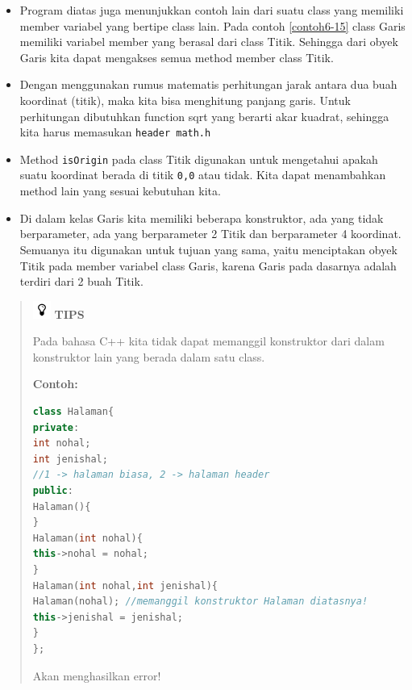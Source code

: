 \begin{itemize}

\item
  Program diatas juga menunjukkan contoh lain dari suatu class yang
  memiliki member variabel yang bertipe class lain. Pada contoh \ref{contoh6-15}
  class Garis memiliki variabel member yang berasal dari class Titik.
  Sehingga dari obyek Garis kita dapat mengakses semua method member
  class Titik.
\item
  Dengan menggunakan rumus matematis perhitungan jarak antara dua buah
  koordinat (titik), maka kita bisa menghitung panjang garis. Untuk
  perhitungan dibutuhkan function sqrt yang berarti akar kuadrat,
  sehingga kita harus memasukan \texttt{header\ math.h}
\item
  Method \texttt{isOrigin} pada class Titik digunakan untuk mengetahui
  apakah suatu koordinat berada di titik \texttt{0,0} atau tidak. Kita
  dapat menambahkan method lain yang sesuai kebutuhan kita.
\item
  Di dalam kelas Garis kita memiliki beberapa konstruktor, ada yang
  tidak berparameter, ada yang berparameter 2 Titik dan berparameter 4
  koordinat. Semuanya itu digunakan untuk tujuan yang sama, yaitu
  menciptakan obyek Titik pada member variabel class Garis, karena Garis
  pada dasarnya adalah terdiri dari 2 buah Titik.
\end{itemize}

\begin{quotation}
\includegraphics{../manuscript/images/tips} \textbf{TIPS} 
	
Pada bahasa C++ kita tidak dapat memanggil konstruktor dari dalam konstruktor
lain yang berada dalam satu class.
	
\textbf{Contoh:}
	
\begin{lstlisting}[language=c++, numbers=none]
class Halaman{
private:
int nohal;
int jenishal;
//1 -> halaman biasa, 2 -> halaman header
public:
Halaman(){
}
Halaman(int nohal){
this->nohal = nohal;
}
Halaman(int nohal,int jenishal){
Halaman(nohal); //memanggil konstruktor Halaman diatasnya!
this->jenishal = jenishal;
}
};
\end{lstlisting}
	
 Akan menghasilkan error!
\end{quotation}

